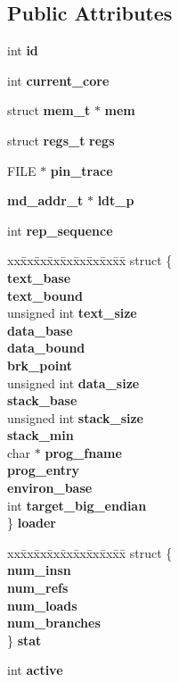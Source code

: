 \subsection*{Public Attributes}
\begin{CompactItemize}
\item 
int {\bf id}
\item 
int {\bf current\_\-core}
\item 
struct {\bf mem\_\-t} $\ast$ {\bf mem}
\item 
struct {\bf regs\_\-t} {\bf regs}
\item 
FILE $\ast$ {\bf pin\_\-trace}
\item 
{\bf md\_\-addr\_\-t} $\ast$ {\bf ldt\_\-p}
\item 
int {\bf rep\_\-sequence}
\item 
\begin{tabbing}
xx\=xx\=xx\=xx\=xx\=xx\=xx\=xx\=xx\=\kill
struct \{\\
 {\bf text\_base}\\
 {\bf text\_bound}\\
\>unsigned int {\bf text\_size}\\
 {\bf data\_base}\\
 {\bf data\_bound}\\
 {\bf brk\_point}\\
\>unsigned int {\bf data\_size}\\
 {\bf stack\_base}\\
\>unsigned int {\bf stack\_size}\\
 {\bf stack\_min}\\
\>char $\ast$ {\bf prog\_fname}\\
 {\bf prog\_entry}\\
 {\bf environ\_base}\\
\>int {\bf target\_big\_endian}\\
\} {\bf loader}\\

\end{tabbing}\item 
\begin{tabbing}
xx\=xx\=xx\=xx\=xx\=xx\=xx\=xx\=xx\=\kill
struct \{\\
 {\bf num\_insn}\\
 {\bf num\_refs}\\
 {\bf num\_loads}\\
 {\bf num\_branches}\\
\} {\bf stat}\\

\end{tabbing}\item 
int {\bf active}
\end{CompactItemize}


